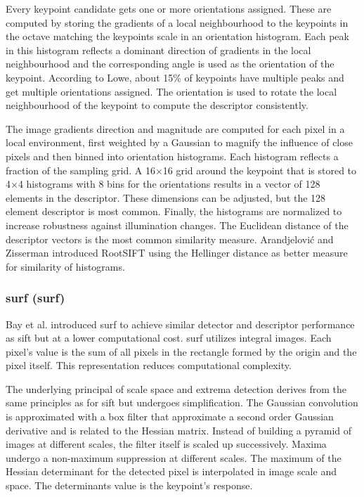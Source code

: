 Every keypoint candidate gets one or more orientations assigned.
These are computed by storing the gradients of a local neighbourhood to the keypoints in the octave matching the keypoints scale in an orientation histogram.
Each peak in this histogram reflects a dominant direction of gradients in the local neighbourhood and the corresponding angle is used as the orientation of the keypoint.
According to Lowe\cite{lowe_ijcv04}, about 15\% of keypoints have multiple peaks and get multiple orientations assigned.
The orientation is used to rotate the local neighbourhood of the keypoint to compute the descriptor consistently.

The image gradients direction and magnitude are computed for each pixel in a local environment, first weighted by a Gaussian to magnify the influence of close pixels and then binned into orientation histograms.
Each histogram reflects a fraction of the sampling grid.
A 16$\times$16 grid around the keypoint that is stored to 4$\times$4 histograms with 8 bins for the orientations results in a vector of 128 elements in the descriptor.
These dimensions can be adjusted, but the 128 element descriptor is most common.
Finally, the histograms are normalized to increase robustness against illumination changes.
The Euclidean distance of the descriptor vectors is the most common similarity measure.
Arandjelović and Zisserman\cite{arandjelovic_2012} introduced RootSIFT using the Hellinger distance\cite{hellinger_1909} as better measure for similarity of histograms.

\subsubsection{\acrshort{surf} (\acrlong{surf})}

Bay et al. introduced \acrshort{surf}\cite{bay_eccv06} to achieve similar detector and descriptor performance as \acrshort{sift} but at a lower computational cost.
\acrshort{surf} utilizes integral images\cite{viola_cvpr01}.
Each pixel's value is the sum of all pixels in the rectangle formed by the origin and the pixel itself.
This representation reduces computational complexity.

The underlying principal of scale space and extrema detection derives from the same principles as for \acrshort{sift} but undergoes simplification.
The Gaussian convolution is approximated with a box filter that approximate a second order Gaussian derivative and is related to the Hessian matrix.
Instead of building a pyramid of images at different scales, the filter itself is scaled up successively.
Maxima undergo a non-maximum suppression at different scales.
The maximum of the Hessian determinant for the detected pixel is interpolated in image scale and space.
The determinants value is the keypoint's response.

